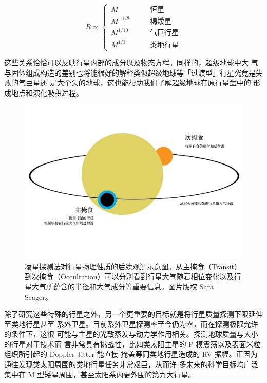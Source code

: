 \begin{equation} \label{eq:massrad}
R \propto \left\{
  \begin{array}{lr}
       \,   M            &  \qquad \text{恒星} 	   \\
       \,   M^{-1/8}  &  \qquad \text{褐矮星} 	   \\
       \,   M^{1/10} &  \qquad \text{气巨行星}   \\
       \,   M^{1/3}   &  \qquad \text{类地行星} 
  \end{array}
\right.
\end{equation} 

这些关系恰恰可以反映行星内部的成分以及物态方程\cite{Zapolsky1969}。同样的，超级地球中大
气与固体组成构造的差别也将能很好的解释类似超级地球等「过渡型」行星究竟是失败的气巨星还
是大个头的地球\cite{Rogers2015a,Lissauer2014}，这也能帮助我们了解超级地球在原行星盘中的
形成地点和演化吸积过程\cite{Miguel2011,Haghighipour2013}。

\begin{figure}[t]
\centering
\includegraphics[width=1.0\textwidth]{figures/chapter5/fig1_eclipsing.pdf}
\caption{凌星探测法对行星物理性质的后续观测示意图。从主掩食（Transit）到次掩食（Occultation）可以分别看到行星大气随着相位变化以及行星大气所蕴含的半径和大气成分等重要信息。图片版权 Sara Seager。}
\label{fig:transitspectro}
\end{figure}


除了研究这些特殊的行星之外，另一个更重要的目标就是将行星质量探测下限延伸至类地行星甚至
系外卫星。目前系外卫星探测率至今仍为零\cite{Kipping2011}，而在探测极限允许的条件下，这很
可能与主星的光致蒸发与动力学作用相关\cite{Yang2016}。探测地球质量与大小的行星对于技术而
言非常具有挑战性，比如类太阳主星的 P 模震荡以及表面米粒组织所引起的 Doppler Jitter 能直接
掩盖等同类地行星造成的 RV 振幅。正因为通往发现类太阳周围的类地行星任务非常艰巨，从而许
多未来的科学目标均广泛集中在 M 型矮星周围，甚至太阳系内更外围的第九大行星\cite{Batygin2016a}。


